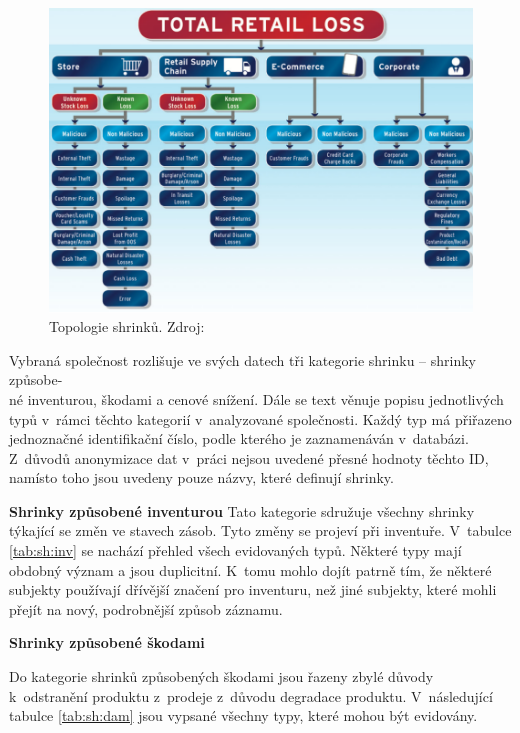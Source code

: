 \begin{figure}[hbtp!]
    \centering
    \captionsetup{justification=centering}
    \includegraphics[width=\textwidth]{obrazky/typyshirnku.png}
    \caption{Topologie shrinků. Zdroj: \cite{bib:shrink2}}
    \label{obr:shrinkytypyBeck}
\end{figure}

Vybraná společnost rozlišuje ve svých datech tři kategorie shrinku -- shrinky způsobe-\\né inventurou, škodami a cenové snížení. Dále se text věnuje popisu jednotlivých typů v~rámci těchto kategorií v~analyzované společnosti. Každý typ má přiřazeno jednoznačné identifikační číslo, podle kterého je zaznamenáván v~databázi. Z~důvodů anonymizace dat v~práci nejsou uvedené přesné hodnoty těchto ID, namísto toho jsou uvedeny pouze názvy, které definují shrinky.

\vspace*{1em}

\textbf{Shrinky způsobené inventurou}
Tato kategorie sdružuje všechny shrinky týkající se změn ve stavech zásob. Tyto změny se projeví při inventuře. V~tabulce \ref*{tab:sh:inv} se nachází přehled všech evidovaných typů. Některé typy mají obdobný význam a jsou duplicitní. K~tomu mohlo dojít patrně tím, že některé subjekty používají dřívější značení pro inventuru, než jiné subjekty, které mohli přejít na nový, podrobnější způsob záznamu. 

\vspace*{1em}

\textbf{Shrinky způsobené škodami}

Do kategorie shrinků způsobených škodami jsou řazeny zbylé důvody k~odstranění produktu z~prodeje z~důvodu degradace produktu. V~následující tabulce \ref{tab:sh:dam} jsou vypsané všechny typy, které mohou být evidovány.

